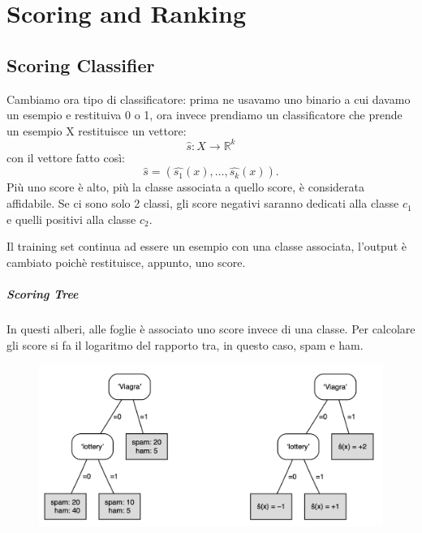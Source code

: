 \chapter{Scoring and Ranking}
\section{Scoring Classifier}
Cambiamo ora tipo di classificatore: prima ne usavamo uno binario a cui davamo un esempio e restituiva 0 o 1, ora invece prendiamo un classificatore che prende un esempio X restituisce un vettore:
\begin{equation}
    \hat{s}: X \rightarrow \mathbb{R}^k
\end{equation}
con il vettore fatto così:
\begin{equation}
    \hat{s}=(\hat{s_1}(x),\dots,\hat{s_k}(x)).
\end{equation}
Più uno score è alto, più la classe associata a quello score, è considerata affidabile.
Se ci sono solo 2 classi, gli score negativi saranno dedicati alla classe $c_1$ e quelli positivi alla classe $c_2$.

Il training set continua ad essere un esempio con una classe associata, l'output è cambiato poichè restituisce, appunto, uno score.

\paragraph{Scoring Tree}
In questi alberi, alle foglie è associato uno score invece di una classe. Per calcolare gli score si fa il logaritmo del rapporto tra, in questo caso, spam e ham.
\begin{figure}[!h]
    \centering
    \includegraphics[scale=0.7]{images/scoringTree.png}
    \label{fig:enter-label}
\end{figure}

